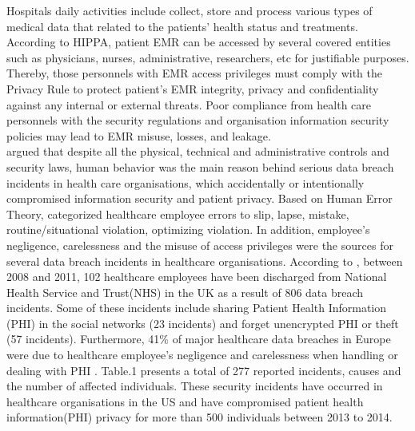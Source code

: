 Hospitals daily activities include collect, store and process various types of medical data that related to the patients' health status and treatments. According to HIPPA, patient EMR can be accessed by several covered entities such as physicians, nurses, administrative, researchers, etc for justifiable purposes. Thereby, those personnels with EMR access privileges must comply with the Privacy Rule to protect patient's EMR integrity, privacy and confidentiality against any internal or external threats. Poor compliance from health care personnels with the security regulations and organisation information security policies may lead to EMR misuse, losses, and leakage.\\
\citet{Kamoun} argued that despite all the physical, technical and administrative controls and security laws, human behavior was the main reason behind serious data breach incidents in health care organisations, which accidentally or intentionally compromised information security and patient privacy. Based on Human Error Theory, \citet{Kamoun} categorized healthcare employee errors to slip, lapse, mistake, routine/situational violation, optimizing violation. In addition, employee’s negligence, carelessness and the misuse of access privileges were the sources for several data breach incidents in healthcare organisations. According to  \cite{Kamoun}, between 2008 and 2011, 102 healthcare employees have been discharged from National Health Service and Trust(NHS) in the UK as a result of 806 data breach incidents. Some of these incidents include sharing Patient Health Information (PHI) in the social networks (23 incidents) and forget unencrypted PHI or theft (57 incidents). Furthermore, 41\% of major healthcare data breaches in Europe were due to healthcare employee’s negligence and carelessness when handling or dealing with PHI \cite{Kierkegaard2012,Kamoun}. Table.1 presents a total of 277 reported incidents, causes and the number of affected individuals. These security incidents have occurred in healthcare organisations in the US and have compromised patient health information(PHI) privacy for more than 500 individuals between 2013 to 2014. 
\graphicspath{ {image/} }
